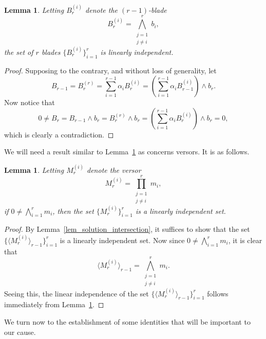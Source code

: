 \documentclass{birkjour}
\newtheorem{lem}[thm]{Lemma}
\theoremstyle{definition}
\theoremstyle{remark}
\numberwithin{equation}{section}
\begin{document}
\begin{lem}\label{lem_lin_indep_subblades}
Letting $B_r^{(i)}$ denote the $(r-1)$-blade
\begin{equation*}
B_r^{(i)} = \bigwedge_{\substack{j=1\\j\neq i}}^r b_i,
\end{equation*}
the set of $r$ blades $\{B_r^{(i)}\}_{i=1}^r$ is linearly independent.
\end{lem}
\begin{proof}
Supposing to the contrary, and without loss of generality, let
\begin{equation*}
B_{r-1} = B_r^{(r)} = \sum_{i=1}^{r-1}\alpha_i B_r^{(i)} = \left(\sum_{i=1}^{r-1}\alpha_i B_{r-1}^{(i)}\right)\wedge b_r.
\end{equation*}
Now notice that
\begin{equation*}
0\neq B_r = B_{r-1}\wedge b_r = B_r^{(r)}\wedge b_r = \left(\sum_{i=1}^{r-1}\alpha_i B_r^{(i)}\right)\wedge b_r = 0,
\end{equation*}
which is clearly a contradiction.
\end{proof}

We will need a result similar to Lemma~\ref{lem_lin_indep_subblades} as concerns versors.  It is as follows.
\begin{lem}\label{lem_lin_indep_subspades}
Letting $M_r^{(i)}$ denote the versor
\begin{equation*}
M_r^{(i)} = \prod_{\substack{j=1\\j\neq i}}^r m_i,
\end{equation*}
if $0\neq\bigwedge_{i=1}^r m_i$, then the set $\{M_r^{(i)}\}_{i=1}^r$ is a linearly independent set.
\end{lem}
\begin{proof}
By Lemma~\ref{lem_solution_intersection}, it suffices to show that the set $\{\langle M_r^{(i)}\rangle_{r-1}\}_{i=1}^r$ is a linearly independent set.
Now since $0\neq\bigwedge_{i=1}^r m_i$, it is clear that
\begin{equation*}
\langle M_r^{(i)}\rangle_{r-1} = \bigwedge_{\substack{j=1\\j\neq i}}^r m_i.
\end{equation*}
Seeing this, the linear independence of the set $\{\langle M_r^{(i)}\rangle_{r-1}\}_{i=1}^r$ follows immediately
from Lemma~\ref{lem_lin_indep_subblades}.
\end{proof}

We turn now to the establishment of some identities that will be important to our cause.
\end{document}
